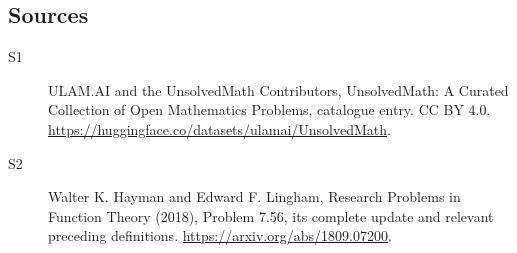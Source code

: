 \documentclass[11pt]{article}
\begin{document}
\subsection{Sources}
\begin{description}
\item[\hypertarget{source:statement:1}{S1}] ULAM.AI and the UnsolvedMath Contributors, UnsolvedMath: A Curated Collection of Open Mathematics Problems, catalogue entry. CC BY 4.0. \url{https://huggingface.co/datasets/ulamai/UnsolvedMath}.
\item[\hypertarget{source:statement:2}{S2}] Walter K. Hayman and Edward F. Lingham, Research Problems in Function Theory (2018), Problem 7.56, its complete update and relevant preceding definitions. \url{https://arxiv.org/abs/1809.07200}.
\end{description}
\label{end:statement}
\end{document}
